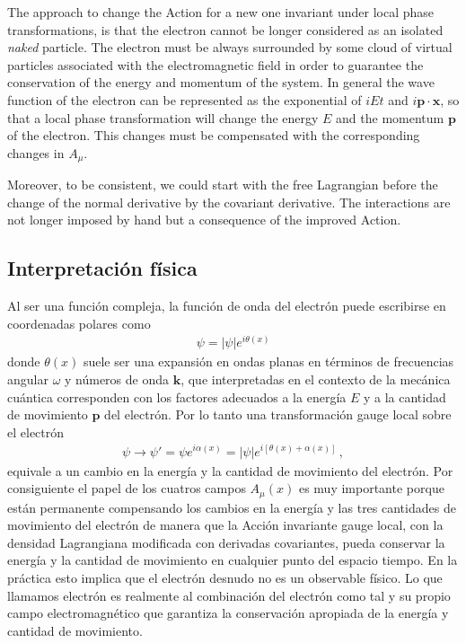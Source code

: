 The approach to change the Action for a new one invariant under local phase  transformations, is that the electron cannot be longer considered as an isolated \emph{naked} particle. The electron must be always surrounded by some cloud of virtual particles associated with the electromagnetic field in order to guarantee the conservation of the energy and momentum of the system. In general the wave function of the electron can be represented as the exponential of $iEt$ and $i \mathbf{p}\cdot \mathbf{x}$, so that a local phase transformation will change the energy $E$ and the momentum $\mathbf{p}$ of the electron. This changes must be compensated with the corresponding changes in $A_{\mu}$.

Moreover, to be consistent, we could start with the free Lagrangian before the change of the normal derivative by the covariant derivative. The interactions are not longer imposed by hand but a consequence of the improved Action. 

\subsection{Interpretación física}
Al ser una función compleja, la función de onda del electrón puede escribirse en coordenadas polares como
\begin{align}
  \psi=|\psi|e^{i\theta(x)}
\end{align}
donde $\theta(x)$ suele ser una expansión en ondas planas en términos de frecuencias angular $\omega$ y números de onda $\mathbf{k}$, que interpretadas en el contexto de la mecánica cuántica corresponden con los factores adecuados a la energía $E$ y a la cantidad de movimiento $\mathbf{p}$ del electrón. Por lo tanto una transformación gauge local sobre el electrón
\begin{align}
  \psi\to \psi'=\psi e^{i\alpha(x)}=|\psi|e^{i[\theta(x)+\alpha(x)]}\,,
\end{align}
equivale a un cambio en la energía y la cantidad de movimiento del electrón. Por consiguiente el papel de los cuatros campos $A_{\mu}(x)$ es muy importante porque están permanente compensando los cambios en la energía y las tres cantidades de movimiento del electrón de manera que la Acción invariante gauge local, con la densidad Lagrangiana modificada con derivadas covariantes, pueda conservar la energía y la cantidad de movimiento en cualquier punto del espacio tiempo. En la práctica esto implica que el electrón desnudo no es un observable físico. Lo que llamamos electrón es realmente al combinación del electrón como tal y su propio campo electromagnético que garantiza la conservación apropiada de la energía y cantidad de movimiento. 


